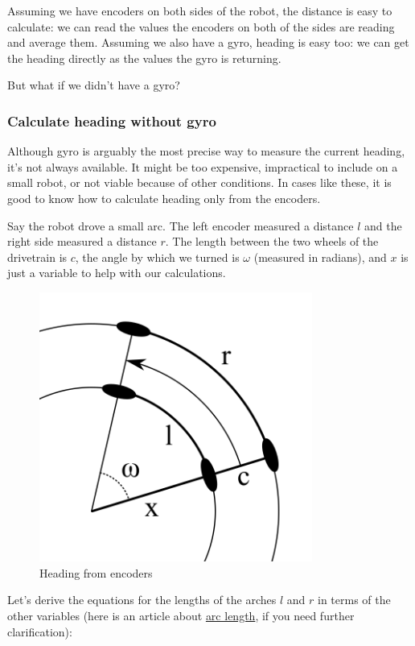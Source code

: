 \documentclass[12pt,twoside]{article}
\begin{document}
Assuming we have encoders on both sides of the robot, the distance is easy to calculate: we can read the values the encoders on both of the sides are reading and average them. Assuming we also have a gyro, heading is easy too: we can get the heading directly as the values the gyro is returning.

But what if we didn't have a gyro?


\subsubsection{Calculate heading without gyro}
Although gyro is arguably the most precise way to measure the current heading, it's not always available. It might be too expensive, impractical to include on a small robot, or not viable because of other conditions. In cases like these, it is good to know how to calculate heading only from the encoders.

Say the robot drove a small arc. The left encoder measured a distance $l$ and the right side measured a distance $r$. The length between the two wheels of the drivetrain is $c$, the angle by which we turned is $\omega$ (measured in radians), and $x$ is just a variable to help with our calculations.

\begin{figure}[H]
\centering
\includegraphics[width=0.8\textwidth]{../assets/images/odometry/heading-from-encoders.png}
\caption{Heading from encoders}
\end{figure}

Let's derive the equations for the lengths of the arches $l$ and $r$ in terms of the other variables (here is an article about \href{https://www.mathopenref.com/arclength.html}{arc length}, if you need further clarification):
\end{document}
